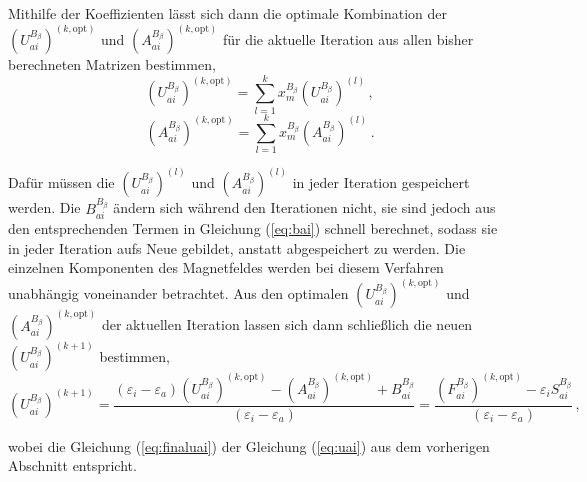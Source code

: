     Mithilfe der Koeffizienten lässt sich dann die optimale Kombination der $\left(U_{ai}^{B_\beta}\right)^{(k,\textrm{opt})}$ und $\left(A_{ai}^{B_\beta}\right)^{(k,\textrm{opt})}$ für die aktuelle Iteration aus allen bisher berechneten Matrizen bestimmen, 
     \begin{equation}\label{eq:uaiopt}
     \left(U_{ai}^{B_\beta}\right)^{(k,\textrm{opt})}=\sum_{l=1}^k x_m^{B_\beta} \left(U_{ai}^{B_\beta}\right)^{(l)}\, ,
     \end{equation}
     \begin{equation}\label{eq:aaiopt}
     \left(A_{ai}^{B_\beta}\right)^{(k,\textrm{opt})}=\sum_{l=1}^k x_m^{B_\beta} \left(A_{ai}^{B_\beta}\right)^{(l)}\, .
     \end{equation}
     
     Dafür müssen die $\left(U_{ai}^{B_\beta}\right)^{(l)}$ und $\left(A_{ai}^{B_\beta}\right)^{(l)}$ in jeder Iteration gespeichert werden. Die $B_{ai}^{B_\beta}$ ändern sich während den Iterationen nicht, sie sind jedoch aus den entsprechenden Termen in Gleichung (\ref{eq:bai}) schnell berechnet, sodass sie in jeder Iteration aufs Neue gebildet, anstatt abgespeichert zu werden. Die einzelnen Komponenten des Magnetfeldes werden bei diesem Verfahren unabhängig voneinander betrachtet. Aus den optimalen $\left(U_{ai}^{B_\beta}\right)^{(k,\textrm{opt})}$ und $\left(A_{ai}^{B_\beta}\right)^{(k,\textrm{opt})}$ der aktuellen Iteration lassen sich dann schließlich die neuen $\left(U_{ai}^{B_\beta}\right)^{(k+1)}$ bestimmen,     
     \begin{equation}\label{eq:finaluai}
     \left(U_{ai}^{B_\beta}\right)^{(k+1)}=\frac{\left(\varepsilon_i-\varepsilon_a\right)\left(U_{ai}^{B_\beta}\right)^{(k,\textrm{opt})}-\left(A_{ai}^{B_\beta}\right)^{(k,\textrm{opt})}+B_{ai}^{B_\beta}}{\left(\varepsilon_i-\varepsilon_a\right)}=\frac{\left(F_{ai}^{B_\beta}\right)^{(k,\textrm{opt})}-\varepsilon_i S_{ai}^{B_\beta}}{\left(\varepsilon_i-\varepsilon_a\right)}\, ,
     \end{equation}
     
     wobei die Gleichung (\ref{eq:finaluai}) der Gleichung (\ref{eq:uai}) aus dem vorherigen Abschnitt entspricht.

